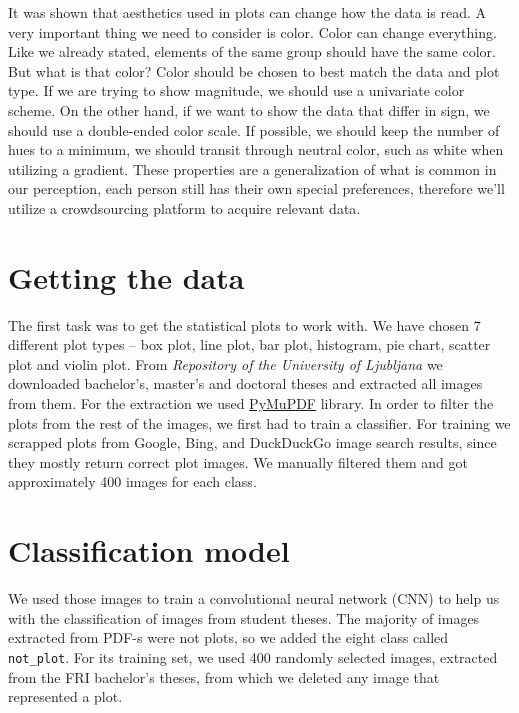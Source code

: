 \documentclass[fleqn,moreauthors,10pt]{ds_report}
\begin{document}
It was shown that aesthetics used in plots can change how the data is read. A very important thing we need to consider is color. Color can change everything. Like we already stated, elements of the same group should have the same color. But what is that color? Color should be chosen to best match the data and plot type. If we are trying to show magnitude, we should use a univariate color scheme. On the other hand, if we want to show the data that differ in sign, we should use a double-ended color scale. If possible, we should keep the number of hues to a minimum, we should transit through neutral color, such as white when utilizing a gradient. These properties are a generalization of what is common in our perception, each person still has their own special preferences, therefore we'll utilize a crowdsourcing platform to acquire relevant data.

\section*{Getting the data}
The first task was to get the statistical plots to work with. We have chosen 7 different plot types -- box plot, line plot, bar plot, histogram, pie chart, scatter plot and violin plot. From \emph{Repository of the University of Ljubljana} \cite{repositoryUL} we downloaded bachelor's, master's and doctoral theses and extracted all images from them. For the extraction we used \href{https://github.com/pymupdf/PyMuPDF}{PyMuPDF} library. In order to filter the plots from the rest of the images, we first had to train a classifier. For training we scrapped plots from Google, Bing, and DuckDuckGo image search results, since they mostly return correct plot images. We manually filtered them and got approximately 400 images for each class.

\section*{Classification model}
We used those images to train a convolutional neural network (CNN) to help us with the classification of images from student theses. The majority of images extracted from PDF-s were not plots, so we added the eight class called \texttt{not\_plot}. For its training set, we used 400 randomly selected images, extracted from the FRI bachelor's theses, from which we deleted any image that represented a plot.
\end{document}
